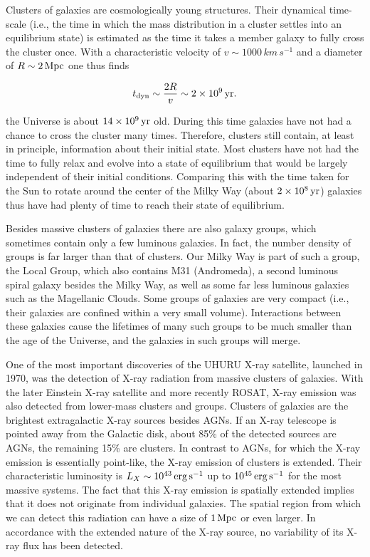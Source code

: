 \documentclass[a4paper,11pt]{article}
\begin{document}
{\noindent}Clusters of galaxies are cosmologically young structures. Their dynamical time-scale (i.e., the time in which the mass distribution in a cluster settles into an equilibrium state) is estimated as the time it takes a member galaxy to fully cross the cluster once. With a characteristic velocity of $v\sim1000\,{km\,s^{-1}}$ and a diameter of $R\sim2\,{\rm Mpc}$ one thus finds

\begin{align*}
    t_\mathrm{dyn} \sim \frac{2R}{v} \sim 2\times10^9\,{\rm yr}.
\end{align*}

{\noindent}the Universe is about $14\times10^9\,{\rm yr}$ old. During this time galaxies have not had a chance to cross the cluster many times. Therefore, clusters still contain, at least in principle, information about their initial state. Most clusters have not had the time to fully relax and evolve into a state of equilibrium that would be largely independent of their initial conditions. Comparing this with the time taken for the Sun to rotate around the center of the Milky Way (about $2\times10^8\,{\rm yr}$) galaxies thus have had plenty of time to reach their state of equilibrium.

{\noindent}Besides massive clusters of galaxies there are also galaxy groups, which sometimes contain only a few luminous galaxies. In fact, the number density of groups is far larger than that of clusters. Our Milky Way is part of such a group, the Local Group, which also contains M31 (Andromeda), a second luminous spiral galaxy besides the Milky Way, as well as some far less luminous galaxies such as the Magellanic Clouds. Some groups of galaxies are very compact (i.e., their galaxies are confined within a very small volume). Interactions between these galaxies cause the lifetimes of many such groups to be much smaller than the age of the Universe, and the galaxies in such groups will merge.

{\noindent}One of the most important discoveries of the UHURU X-ray satellite, launched in 1970, was the detection of X-ray radiation from massive clusters of galaxies. With the later Einstein X-ray satellite and more recently ROSAT, X-ray emission was also detected from lower-mass clusters and groups. Clusters of galaxies are the brightest extragalactic X-ray sources besides AGNs. If an X-ray telescope is pointed away from the Galactic disk, about 85\% of the detected sources are AGNs, the remaining 15\% are clusters. In contrast to AGNs, for which the X-ray emission is essentially point-like, the X-ray emission of clusters is extended. Their characteristic luminosity is $L_X\sim10^{43}\,{\rm erg\,s^{-1}}$ up to $10^{45}\,{\rm erg\,s^{-1}}$ for the most massive systems. The fact that this X-ray emission is spatially extended implies that it does not originate from individual galaxies. The spatial region from which we can detect this radiation can have a size of $1\,{\rm Mpc}$ or even larger. In accordance with the extended nature of the X-ray source, no variability of its X-ray flux has been detected.
\end{document}
